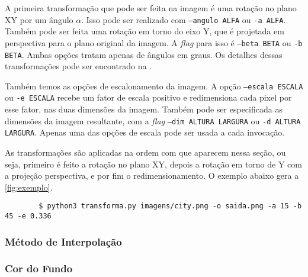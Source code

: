     A primeira transformação que pode ser feita na imagem é uma rotação no plano XY por um ângulo $\alpha$. Isso pode ser realizado com \texttt{--angulo ALFA} ou \texttt{-a ALFA}. Também pode ser feita uma rotação em torno do eixo Y, que é projetada em perspectiva para o plano original da imagem. A \textit{flag} para isso é \texttt{--beta BETA} ou \texttt{-b BETA}. Ambas opções tratam apenas de ângulos em graus. Os detalhes dessas transformações pode ser encontrado na .


    Também temos as opções de escalonamento da imagem. A opção \texttt{--escala ESCALA} ou \texttt{-e ESCALA} recebe um fator de escala positivo e redimensiona cada pixel por esse fator, nas duas dimensões da imagem. Também pode ser especificada as dimensões da imagem resultante, com a \textit{flag} \texttt{--dim ALTURA LARGURA} ou \texttt{-d ALTURA LARGURA}. Apenas uma das opções de escala pode ser usada a cada invocação.

    As transformações são aplicadas na ordem com que aparecem nessa seção, ou seja, primeiro é feito a rotação no plano XY, depois a rotação em torno de Y com a projeção perspectiva, e por fim o redimensionamento. O exemplo abaixo gera a \cref{fig:exemplo}.

    \begin{verbatim}
        $ python3 transforma.py imagens/city.png -o saida.png -a 15 -b 45 -e 0.336
    \end{verbatim}

\subsubsection{}


\subsubsection{Método de Interpolação}


\subsubsection{Cor do Fundo}

